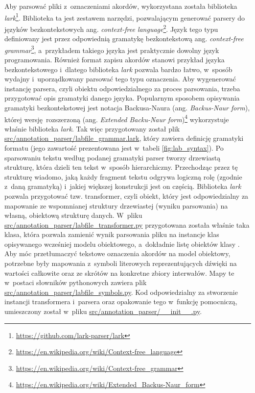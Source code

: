 Aby parsować pliki z~oznaczeniami akordów, wykorzystana została biblioteka \emph{lark}\footnote{\url{https://github.com/lark-parser/lark}}. Biblioteka ta jest zestawem narzędzi, pozwalającym generować parsery do języków bezkontekstowych ang. \emph{context-free language}\footnote{\url{https://en.wikipedia.org/wiki/Context-free_language}}. Język tego typu definiowany jest przez odpowiednią gramatykę bezkontekstową ang. \emph{context-free grammar}\footnote{\url{https://en.wikipedia.org/wiki/Context-free_grammar}}, a~przykładem takiego języka jest praktycznie dowolny język programowania. Również format zapisu akordów stanowi przykład języka bezkontekstowego i~dlatego biblioteka \emph{lark} pozwala bardzo łatwo, w~sposób wydajny i~uporządkowany parsować tego typu oznaczenia. Aby wygenerować instancję parsera, czyli obiektu odpowiedzialnego za proces parsowania, trzeba przygotować opis gramatyki danego języka. Popularnym sposobem opisywania gramatyki bezkontekstowej jest notacja Backusa-Naura (ang. \emph{Backus-Naur form}), której wersję rozszerzoną (ang. \emph{Extended Backu-Naur form})\footnote{\url{https://en.wikipedia.org/wiki/Extended_Backus-Naur_form}} wykorzystuje właśnie biblioteka \emph{lark}. Tak więc przygotowany został plik \url{src/annotation_parser/labfile_grammar.lark}, który zawiera definicję gramatyki formatu  (jego zawartość prezentowana jest w~tabeli \ref{fig:lab_syntax}). Po sparsowaniu tekstu według podanej gramatyki parser tworzy drzewiastą strukturę, która dzieli ten tekst w~sposób hierarchiczny. Przechodząc przez tę strukturę wiadomo, jaką każdy fragment tekstu odgrywa logiczną rolę (zgodnie z~daną gramatyką) i~jakiej większej konstrukcji jest on częścią. Biblioteka \emph{lark} pozwala przygotować tzw. transformer, czyli obiekt, który jest odpowiedzialny za mapowanie ze wspomnianej struktury drzewiastej (wyniku parsowania) na własną, obiektową strukturę danych. W~pliku \url{src/annotation_parser/labfile_transformer.py} przygotowana została właśnie taka klasa, która pozwala zamienić wynik parsowania pliku  na instancje klas opisywanego wcześniej modelu obiektowego, a~dokładnie listę obiektów klasy . Aby móc przetłumaczyć tekstowe oznaczenia akordów na model obiektowy, potrzebne były mapowania z~symboli literowych reprezentujących dźwięki na wartości całkowite oraz ze skrótów na konkretne zbiory interwałów. Mapy te w~postaci słowników pythonowych zawiera plik \url{src/annotation_parser/labfile_symbols.py}. Kod odpowiedzialny za stworzenie instancji transformera i~parsera oraz opakowanie tego w~funkcję pomocniczą, umieszczony został w~pliku \url{src/annotation_parser/__init__.py}. 

